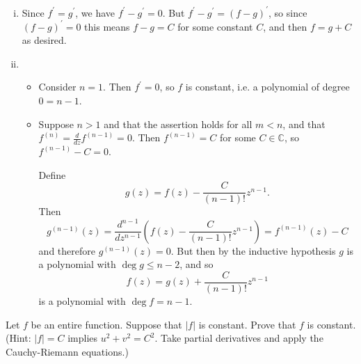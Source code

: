 \documentclass{article}
\newcounter{Problem}
\newenvironment{Problem}{\begin{Exercise}[name={Problem},
                                          counter={Problem}]}
                        {\end{Exercise}}
\begin{document}
\begin{Answer}
  \begin{enumerate}[(i)]
    \item{
      Since $f^\prime = g^\prime$, we have $f^\prime - g^\prime = 0$.
      But $f^\prime - g^\prime = (f - g)^\prime$, so since
      $(f - g)^\prime = 0$ this means $f - g = C$ for some constant
      $C$, and then $f = g + C$ as desired.
    }
    \item{
      \begin{itemize}
        \item{
          Consider $n = 1$. Then $f^\prime = 0$, so $f$ is constant,
          i.e. a polynomial of degree $0 = n - 1$.
        }
        \item{
          Suppose $n > 1$ and that the assertion holds for all
          $m < n$, and that $f^{(n)} = \frac{d}{dz} f^{(n-1)} = 0$. Then
          $f^{(n-1)} = C$ for some $C \in \mathbb{C}$,
          so $f^{(n-1)} - C = 0$.

          Define
          $$
          g(z) = f(z) - \frac{C}{(n-1)!} z^{n-1}.
          $$
          Then
          $$
            g^{(n-1)}(z)
          = \frac{d^{n-1}}{dz^{n-1}} \left( f(z) - \frac{C}{(n-1)!}
            z^{n-1} \right)
          = f^{(n-1)}(z) - C
          $$
          and therefore $g^{(n-1)}(z) = 0$. But then by the inductive
          hypothesis $g$ is a polynomial with $\deg g \leq n - 2$, and
          so
          $$
          f(z) = g(z) + \frac{C}{(n-1)!}z^{n-1}
          $$
          is a polynomial with $\deg f = n - 1$.
        }
      \end{itemize}
    }
  \end{enumerate}
\end{Answer}

\begin{Problem}
  Let $f$ be an entire function. Suppose that $|f|$ is constant. Prove
  that $f$ is constant.
  (Hint: $|f| = C$ implies $u^2 + v^2 = C^2$. Take partial derivatives
  and apply the Cauchy-Riemann equations.)
\end{Problem}
\end{document}

